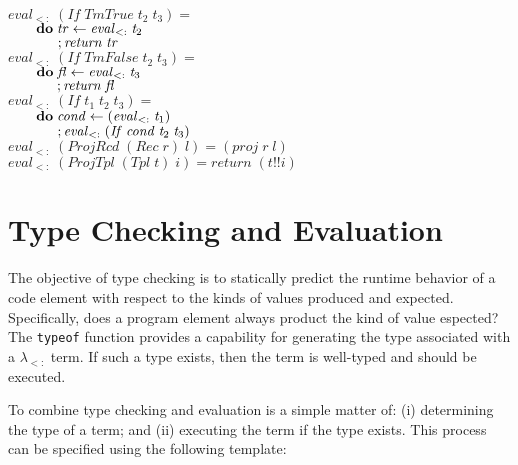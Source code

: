 \documentclass[10pt]{article}
\newcommand{\Conid}[1]{\mathit{#1}}
\newcommand{\Varid}[1]{\mathit{#1}}
\begin{document}
\begin{tabbing}
${}$\\
${\Varid{eval}_{<:}\;(\Conid{If}\;\Conid{TmTrue}\;\Varid{t}_2\;\Varid{t}_3)\mathrel{=}}$\\
${\hskip2.00em\relax\mathbf{do}\;\Varid{tr}\leftarrow \Varid{eval}_{<:}\;\Varid{t}_2}$\\
${\hskip2.00em\relax\phantom{\mathbf{do}\;\mbox{}};\Varid{return}\;\Varid{tr}}$\\
${\Varid{eval}_{<:}\;(\Conid{If}\;\Conid{TmFalse}\;\Varid{t}_2\;\Varid{t}_3)\mathrel{=}}$\\
${\hskip2.00em\relax\mathbf{do}\;\Varid{fl}\leftarrow \Varid{eval}_{<:}\;\Varid{t}_3}$\\
${\hskip2.00em\relax\phantom{\mathbf{do}\;\mbox{}};\Varid{return}\;\Varid{fl}}$\\
${\Varid{eval}_{<:}\;(\Conid{If}\;\Varid{t}_1\;\Varid{t}_2\;\Varid{t}_3)\mathrel{=}}$\\
${\hskip2.00em\relax\mathbf{do}\;\Varid{cond}\leftarrow (\Varid{eval}_{<:}\;\Varid{t}_1)}$\\
${\hskip2.00em\relax\phantom{\mathbf{do}\;\mbox{}};\Varid{eval}_{<:}\;(\Conid{If}\;\Varid{cond}\;\Varid{t}_2\;\Varid{t}_3)}$\\
${\Varid{eval}_{<:}\;(\Conid{ProjRcd}\;(\Conid{Rec}\;\Varid{r})\;\Varid{l})\mathrel{=}(\Varid{proj}\;\Varid{r}\;\Varid{l})}$\\
${\Varid{eval}_{<:}\;(\Conid{ProjTpl}\;(\Conid{Tpl}\;\Varid{t})\;\Varid{i})\mathrel{=}\Varid{return}\;(\Varid{t}\mathbin{!!}\Varid{i})}$
\end{tabbing}
\section{Type Checking and Evaluation}

The objective of type checking is to statically predict the runtime
behavior of a code element with respect to the kinds of values
produced and expected.  Specifically, does a program element always
product the kind of value espected?  The \texttt{typeof} function
provides a capability for generating the type associated with a
$\lambda_{<:}$ term.  If such a type exists, then the term is
well-typed and should be executed.

To combine type checking and evaluation is a simple matter of: (i)
determining the type of a term; and (ii) executing the term if the
type exists.  This process can be specified using the following
template:
\end{document}
